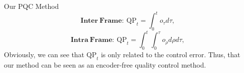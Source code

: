 \documentclass[final]{beamer}
\newlength{\onecolwid}
\newlength{\twocolwid}
\begin{document}
\begin{frame}[t]
\begin{columns}[t]
\begin{column}{\twocolwid}
\begin{columns}[t,totalwidth=\twocolwid]
\begin{column}{\onecolwid}
\begin{block}{Our PQC Method}
\begin{equation}
\label{final-policy-function-inter}
\mathbf{Inter~Frame:~}\mathrm{QP}_{t}=\int_0^{t} o_\tau d{\tau},
\end{equation}
\begin{equation}
\label{final-policy-function-intra}
\mathbf{Intra~Frame:~}\mathrm{QP}_{t}=\int_0^{t}\int_0^{\tau} o_\rho d{\rho}d{\tau},
\end{equation}
Obviously, we can see that $\mathrm{QP}_t$ is only related to the control error. Thus, that our method can be seen as an encoder-free quality control method.
\end{block}

\end{column} %

\end{columns} %


%
%


\begin{columns}[t,totalwidth=\twocolwid] %

\begin{column}{\onecolwid} %




\end{column} %


\end{columns}
\end{column}
\end{columns}
\end{frame}
\end{document}
